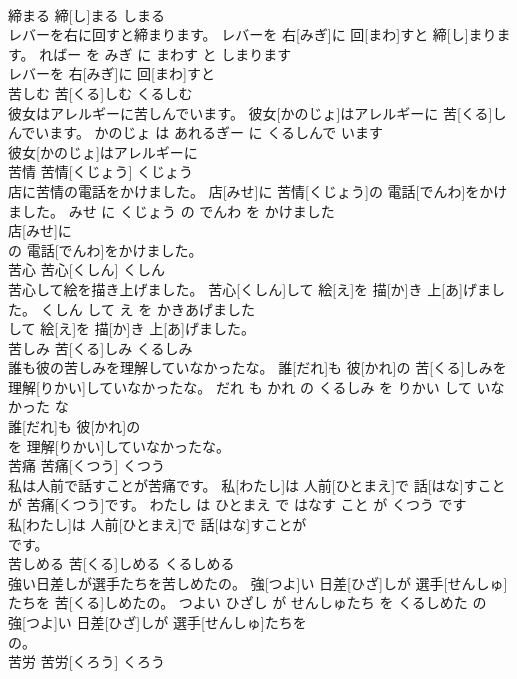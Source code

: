 \documentclass[8pt]{extreport}
\begin{document}
\begin{CJK}{UTF8}{min}
\\	締まる	締[し]まる	しまる	
\\	レバーを右に回すと締まります。	レバーを 右[みぎ]に 回[まわ]すと 締[し]まります。	ればー を みぎ に まわす と しまります	
\\	レバーを 右[みぎ]に 回[まわ]すと
\\	苦しむ	苦[くる]しむ	くるしむ	
\\	彼女はアレルギーに苦しんでいます。	彼女[かのじょ]はアレルギーに 苦[くる]しんでいます。	かのじょ は あれるぎー に くるしんで います	
\\	彼女[かのじょ]はアレルギーに
\\	苦情	苦情[くじょう]	くじょう	
\\	店に苦情の電話をかけました。	店[みせ]に 苦情[くじょう]の 電話[でんわ]をかけました。	みせ に くじょう の でんわ を かけました	
\\	店[みせ]に
\\	の 電話[でんわ]をかけました。			
\\	苦心	苦心[くしん]	くしん	
\\	苦心して絵を描き上げました。	苦心[くしん]して 絵[え]を 描[か]き 上[あ]げました。	くしん して え を かきあげました	
\\	して 絵[え]を 描[か]き 上[あ]げました。			
\\	苦しみ	苦[くる]しみ	くるしみ	
\\	誰も彼の苦しみを理解していなかったな。	誰[だれ]も 彼[かれ]の 苦[くる]しみを 理解[りかい]していなかったな。	だれ も かれ の くるしみ を りかい して いなかった な	
\\	誰[だれ]も 彼[かれ]の
\\	を 理解[りかい]していなかったな。			
\\	苦痛	苦痛[くつう]	くつう	
\\	私は人前で話すことが苦痛です。	私[わたし]は 人前[ひとまえ]で 話[はな]すことが 苦痛[くつう]です。	わたし は ひとまえ で はなす こと が くつう です	
\\	私[わたし]は 人前[ひとまえ]で 話[はな]すことが
\\	です。			
\\	苦しめる	苦[くる]しめる	くるしめる	
\\	強い日差しが選手たちを苦しめたの。	強[つよ]い 日差[ひざ]しが 選手[せんしゅ]たちを 苦[くる]しめたの。	つよい ひざし が せんしゅたち を くるしめた の	
\\	強[つよ]い 日差[ひざ]しが 選手[せんしゅ]たちを
\\	の。			
\\	苦労	苦労[くろう]	くろう	

\end{CJK}
\end{document}
